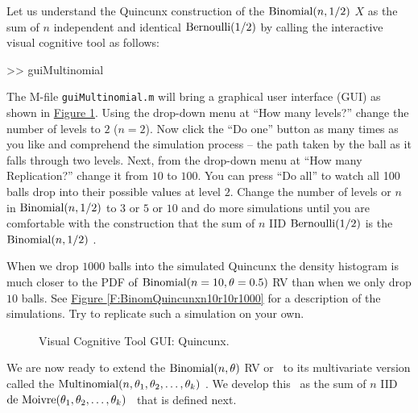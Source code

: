 \begin{labwork}\label{LW:QuincunxSampler}
Let us understand the Quincunx construction of the $\mbox{{\rm Binomial}}(n,1/2)$ \rv $X$ as the sum of $n$ independent and identical $\mbox{{\rm Bernoulli}}(1/2)$  by calling the interactive visual cognitive tool as follows:
\begin{VrbM}
>> guiMultinomial
\end{VrbM}
The M-file {\tt guiMultinomial.m} will bring a graphical user interface (GUI) as shown in \hyperref[F:guiMultinomialQuincunx]{Figure \ref*{F:guiMultinomialQuincunx}}.  Using the drop-down menu at ``How many levels?'' change the number of levels to $2$ ($n=2$).  Now click the ``Do one'' button as many times as you like and comprehend the simulation process -- the path taken by the ball as it falls through two levels.  Next, from the drop-down menu at ``How many  Replication?'' change it from $10$ to $100$.  You can press ``Do all'' to watch all 100 balls drop into their possible values at level $2$.  Change the number of levels or $n$ in $\mbox{{\rm Binomial}}(n,1/2)$ \rv to $3$ or $5$ or $10$ and do more simulations until you are comfortable with the construction that the sum of $n$ IID $\mbox{{\rm Bernoulli}}(1/2)$  is the $\mbox{{\rm Binomial}}(n,1/2)$ \rv.

When we drop $1000$ balls into the simulated Quincunx the density histogram is much closer to the PDF of $\mbox{{\rm Binomial}}(n=10,\theta=0.5)$ RV than when we only drop $10$ balls.  See \hyperref[F:BinomQuincunxn10r10r1000]{Figure \ref*{F:BinomQuincunxn10r10r1000}} for a description of the simulations.  Try to replicate such a simulation on your own.
\end{labwork}

\begin{figure}[htpb]
\caption{Visual Cognitive Tool GUI: Quincunx.\label{F:guiMultinomialQuincunx}}
\centering   {}
\end{figure}

We are now ready to extend the $\mbox{{\rm Binomial}}(n,\theta)$ RV or \rv~to its multivariate version called the $\mbox{{\rm Multinomial}}(n,\theta_1,\theta_2,\ldots,\theta_k)$ \rv.  We develop this \rv~as the sum of $n$ IID $\mbox{{\rm de~Moivre}}(\theta_1,\theta_2,\ldots,\theta_k)$ \rv~that is defined next.

